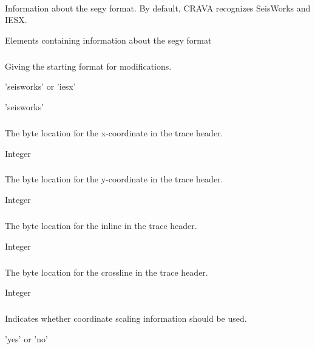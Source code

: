 \paragraph{}
 \slist
   \item \Description Information about the segy format. By default, CRAVA recognizes SeisWorks and IESX.
   \item \Argument Elements containing information about the segy format
   \item \Default
 \elist

\subparagraph{}
 \slist
   \item \Description Giving the starting format for modifications.
   \item \Argument 'seisworks' or 'iesx'
   \item \Default 'seisworks'
 \elist

\subparagraph{}
 \slist
   \item \Description The byte location for the x-coordinate in the trace header.
   \item \Argument Integer
   \item \Default
 \elist

\subparagraph{}
 \slist
   \item \Description The byte location for the y-coordinate in the trace header.
   \item \Argument Integer
   \item \Default
 \elist

\subparagraph{}
 \slist
   \item \Description The byte location for the inline in the trace header.
   \item \Argument Integer
   \item \Default
 \elist

\subparagraph{}
 \slist
   \item \Description The byte location for the crossline in the trace header.
   \item \Argument Integer
   \item \Default
 \elist

\subparagraph{}
 \slist
   \item \Description Indicates whether coordinate scaling information should be used.
   \item \Argument 'yes' or 'no'
   \item \Default
 \elist


